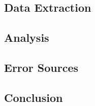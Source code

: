 \subsection{Data Extraction}

\subsection{Analysis}

\subsection{Error Sources}

\subsection{Conclusion}